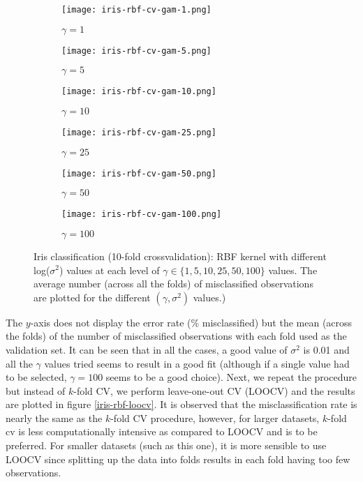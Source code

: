 \documentclass[paper=a4, fontsize=11pt]{scrartcl} %
\numberwithin{equation}{section} %
\begin{document}
\begin{figure}[ht]
\centering
	\begin{subfigure}[b]{0.3\textwidth}
		\centering
		\texttt{[image: iris-rbf-cv-gam-1.png]}
		\caption{$\gamma = 1$}
	\end{subfigure}%
	\begin{subfigure}[b]{0.3\textwidth}
		\centering
		\texttt{[image: iris-rbf-cv-gam-5.png]}
		\caption{$\gamma = 5$}
	\end{subfigure}%
	\begin{subfigure}[b]{0.3\textwidth}
		\centering
		\texttt{[image: iris-rbf-cv-gam-10.png]}
		\caption{$\gamma = 10$}
	\end{subfigure}
		\begin{subfigure}[b]{0.3\textwidth}
		\centering
		\texttt{[image: iris-rbf-cv-gam-25.png]}
		\caption{$\gamma = 25$}
	\end{subfigure}%
	\begin{subfigure}[b]{0.3\textwidth}
		\centering
		\texttt{[image: iris-rbf-cv-gam-50.png]}
		\caption{$\gamma = 50$}
	\end{subfigure}%
	\begin{subfigure}[b]{0.3\textwidth}
		\centering
		\texttt{[image: iris-rbf-cv-gam-100.png]}
		\caption{$\gamma = 100$}
	\end{subfigure}
\caption{Iris classification (10-fold crossvalidation): RBF kernel with different log($\sigma^2$) values at each level of $\gamma \in \{1,5,10,25,50,100\}$ values. The average number (across all the folds) of misclassified observations are plotted for the different $(\gamma, \sigma^2)$ values.)}
\label{iris-rbf-cv}
\end{figure}

The $y$-axis does not display the error rate (\% misclassified) but the mean (across the folds) of the number of misclassified observations with each fold used as the validation set. It can be seen that in all the cases, a good value of $\sigma^2$ is 0.01 and all the $\gamma$ values tried seems to result in a good fit (although if a single value had to be selected, $\gamma = 100$ seems to be a good choice). Next, we repeat the procedure but instead of $k$-fold CV, we perform leave-one-out CV (LOOCV) and the results are plotted in figure \ref{iris-rbf-loocv}. It is observed that the misclassification rate is nearly the same as the $k$-fold CV procedure, however, for larger datasets, $k$-fold cv is less computationally intensive as compared to LOOCV and is to be preferred. For smaller datasets (such as this one), it is more sensible to use LOOCV since splitting up the data into folds results in each fold having too few observations.\\
\end{document}
